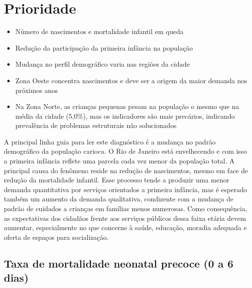 
\chapter{Prioridade}\label{cap:eixo-1}

\begin{achados}\begin{itemize}

\item Número de nascimentos e mortalidade infantil em queda

\item Redução da participação da primeira infância na população

\item Mudança no perfil demográfico varia nas regiões da cidade

\item Zona Oeste concentra nascimentos e deve ser a origem da maior demanda nos próximos anos

\item Na Zona Norte, as crianças pequenas pesam na população o mesmo que na média da cidade (5,0\%), mas os indicadores são mais precários, indicando prevalência de problemas estruturais não solucionados

\end{itemize}\end{achados}

A principal linha guia para ler este diagnóstico é a mudança no padrão demográfico da população carioca. O Rio de Janeiro está envelhecendo e com isso a primeira infância reflete uma parcela cada vez menor da população total. A principal causa do fenômeno reside na redução de nascimentos, mesmo em face de redução da mortalidade infantil. Esse processo tende a produzir uma menor demanda quantitativa por serviços orientados a primeira infância, mas é esperado também um aumento da demanda qualitativa, condizente com a mudança de padrão de cuidados a crianças em famílias menos numerosas. Como consequência, as expectativas dos cidadãos frente aos serviços públicos dessa faixa etária devem aumentar, especialmente no que concerne à saúde, educação, moradia adequada e oferta de espaços para socialização.

\section{Taxa de mortalidade neonatal precoce (0 a 6 dias)}

